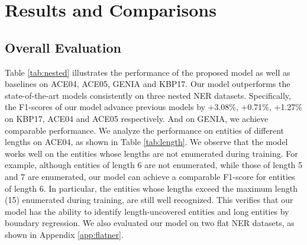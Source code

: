 \documentclass[11pt,a4paper]{article}
\begin{document}
\section{Results and Comparisons}
\subsection{Overall Evaluation}


Table \ref{tab:nested} illustrates the performance of the proposed model as well as baselines on ACE04, ACE05, GENIA and KBP17. Our model outperforms the state-of-the-art models consistently on three nested NER datasets. Specifically, the F1-scores of our model advance previous models by +3.08\%, +0.71\%, +1.27\% on KBP17, ACE04 and ACE05 respectively. And on GENIA, we achieve comparable performance. We analyze the performance on entities of different lengths on ACE04, as shown in Table \ref{tab:length}. 
We observe that the model works well on the entities whose lengths are not enumerated during training.
For example, although entities of length 6 are not enumerated, while those of length 5 and 7 are enumerated, our model can achieve a comparable F1-score for entities of length 6. 
In particular, the entities whose lengths exceed the maximum length (15) enumerated during training, are still well recognized. 
This verifies that our model has the ability to identify length-uncovered entities and long entities by boundary regression. We also evaluated our model on two flat NER datasets, as shown in Appendix \ref{app:flatner}.
\end{document}
